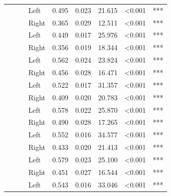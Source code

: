 \begin{longtable}[t]{>{\raggedright\arraybackslash}t{4cm}>{\raggedright\arraybackslash}t{4cm}>{\raggedright\arraybackslash}t{2.5cm}lrrrll}
\nopagebreak
 &  &  & Left & 0.495 & 0.023 & 21.615 & <0.001 & ***\\
\nopagebreak
 &  &  & Right & 0.365 & 0.029 & 12.511 & <0.001 & ***\\
\nopagebreak
 &  &  & Left & 0.449 & 0.017 & 25.976 & <0.001 & ***\\
\nopagebreak
{} &  &  & Right & 0.356 & 0.019 & 18.344 & <0.001 & ***\\
\pagebreak[0]
 &  &  & Left & 0.562 & 0.024 & 23.824 & <0.001 & ***\\
\nopagebreak
 &  &  & Right & 0.456 & 0.028 & 16.471 & <0.001 & ***\\
\nopagebreak
 &  &  & Left & 0.522 & 0.017 & 31.357 & <0.001 & ***\\
\nopagebreak
 &  &  & Right & 0.409 & 0.020 & 20.783 & <0.001 & ***\\
\nopagebreak
 &  &  & Left & 0.578 & 0.022 & 25.870 & <0.001 & ***\\
\nopagebreak
 &  &  & Right & 0.490 & 0.028 & 17.265 & <0.001 & ***\\
\nopagebreak
 &  &  & Left & 0.552 & 0.016 & 34.577 & <0.001 & ***\\
\nopagebreak
 &  &  & Right & 0.433 & 0.020 & 21.413 & <0.001 & ***\\
\nopagebreak
 &  &  & Left & 0.579 & 0.023 & 25.100 & <0.001 & ***\\
\nopagebreak
 &  &  & Right & 0.451 & 0.027 & 16.544 & <0.001 & ***\\
\nopagebreak
 &  &  & Left & 0.543 & 0.016 & 33.046 & <0.001 & ***\\

\end{longtable}
